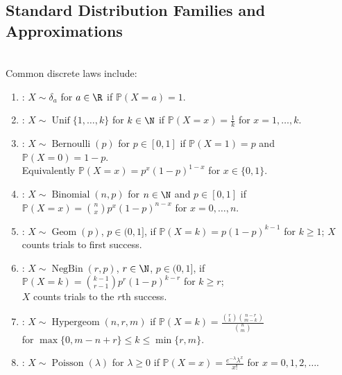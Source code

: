 \subsection{Standard Distribution Families and Approximations}
\begin{definition} \label{def:core-discrete-distributions} \\
Common discrete laws include:
\begin{enumerate}[label=(\roman*)]
\setlength{\itemsep}{0pt}
\item {}: $X\sim\delta_a$ for $a\in\R$ if $\mathbb{P}(X=a)=1$.
\item {}: $X\sim\operatorname{Unif}\{1,\ldots,k\}$ for $k\in\N$ if $\mathbb{P}(X=x)=\frac{1}{k}$ for $x=1,\ldots,k$.
\item {}: $X\sim\operatorname{Bernoulli}(p)$ for $p\in[0,1]$ if $\mathbb{P}(X=1)=p$ and $\mathbb{P}(X=0)=1-p$.\\
Equivalently $\mathbb{P}(X=x)=p^x(1-p)^{1-x}$ for $x\in\{0,1\}$.
\item {}: $X\sim\operatorname{Binomial}(n,p)$ for $n\in\N$ and $p\in[0,1]$ if $\mathbb{P}(X=x)=\binom{n}{x}p^x(1-p)^{n-x}$ for $x=0,\ldots,n$.
\item {}: $X\sim\operatorname{Geom}(p)$, $p\in(0,1]$, if $\mathbb{P}(X=k)=p(1-p)^{k-1}$ for $k\geq1$; $X$ counts trials to first success.
\item {}: $X\sim\operatorname{NegBin}(r,p)$, $r\in\N$, $p\in(0,1]$, if $\mathbb{P}(X=k)=\binom{k-1}{r-1}p^r(1-p)^{k-r}$ for $k\geq r$;\\
$X$ counts trials to the $r$th success.
\item {}: $X\sim\operatorname{Hypergeom}(n,r,m)$ if $\mathbb{P}(X=k)=\frac{\binom{r}{k}\binom{n-r}{m-k}}{\binom{n}{m}}$\\
for $\max\{0,m-n+r\}\leq k\leq\min\{r,m\}$.
\item {}: $X\sim\operatorname{Poisson}(\lambda)$ for $\lambda\geq0$ if $\mathbb{P}(X=x)=\frac{e^{-\lambda}\lambda^x}{x!}$ for $x=0,1,2,\ldots$.
\end{enumerate}
\end{definition}

